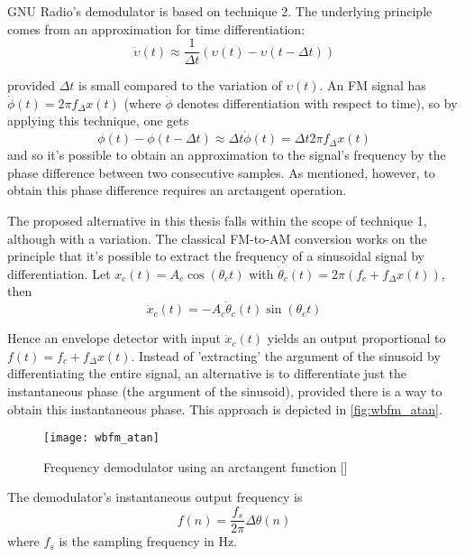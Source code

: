 GNU Radio's demodulator is based on technique 2. The underlying principle comes from an approximation for time differentiation:
\begin{equation}
  \dot{\upsilon}(t) \approx \frac{1}{\Delta t}\left(\upsilon(t) - \upsilon\left(t-\Delta t\right)\right)
\end{equation}

provided $\Delta t$ is small compared to the variation of $\upsilon(t)$. An FM signal has $\dot\phi (t)=2\pi f_{\Delta} x(t)$ (where $\dot\phi$ denotes differentiation with respect to time), so by applying this technique, one gets
\begin{equation}
  \phi(t) - \phi(t-\Delta t) \approx \Delta t \dot\phi(t) = \Delta t 2\pi f_{\Delta} x(t)
\end{equation}
and so it's possible to obtain an approximation to the signal's frequency by the phase difference between two consecutive samples. As mentioned, however, to obtain this phase difference requires an arctangent operation.

The proposed alternative in this thesis falls within the scope of technique 1, although with a variation. The classical FM-to-AM conversion works on the principle that it's possible to extract the frequency of a sinusoidal signal by differentiation. Let $x_c(t)=A_c \cos(\theta{_c}t)$ with $\dot\theta_c(t)=2\pi\left(f_c+f_{\Delta}x(t)\right)$, then
\begin{equation} \label{eq:fm_signal}
  \dot{x}_c(t) = -A_c\dot\theta_c(t) \sin(\theta{_c}t)
\end{equation}

Hence an envelope detector with input $\dot{x}_c(t)$ yields an output proportional to $f(t) = f_c+f_{\Delta}x(t)$. Instead of 'extracting' the argument of the sinusoid by differentiating the entire signal, an alternative is to differentiate just the instantaneous phase (the argument of the sinusoid), provided there is a way to obtain this instantaneous phase. This approach is depicted in \autoref{fig:wbfm_atan}.

\begin{figure}[H]
  \centering
  \texttt{[image: wbfm\_atan]}
  \caption{Frequency demodulator using an arctangent function [\citeauthor{wbfm_alt_receiver}]}
  \label{fig:wbfm_atan}
\end{figure}

The demodulator's instantaneous output frequency is
\begin{equation} \label{eq:digital_fm_demod}
  f(n)= \frac{f_s}{2\pi}\Delta\theta(n)
\end{equation}
where $f_s$ is the sampling frequency in Hz.

